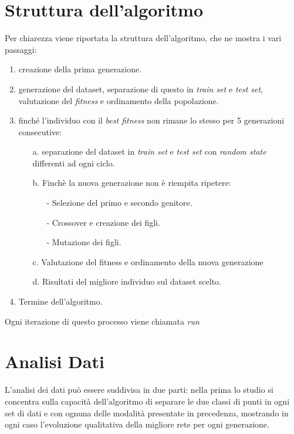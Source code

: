 \documentclass[12pt,a4paper]{report}
\begin{document}
\section{Struttura dell'algoritmo }

Per chiarezza viene riportata la struttura dell'algoritmo, che ne mostra i vari passaggi:

\begin{enumerate}
 \item creazione della prima generazione.
 \item generazione del dataset, separazione di questo in \textit{train set} e \textit{test set}, valutazione del \textit{fitness} e ordinamento della popolazione.
 \item finché l'individuo con il \textit{best fitness} non rimane lo stesso per 5 generazioni consecutive:
 \begin{enumerate}
  \item[a.] separazione del dataset in \textit{train set} e \textit{test set} con \textit{random state} differenti ad ogni ciclo.
  \item[b.] Finchè la nuova generazione non è riempita ripetere:
  \begin{enumerate}
   \item [-] Selezione del primo e secondo genitore.
   \item [-] Crossover e creazione dei figli.
   \item [-] Mutazione dei figli.
  \end{enumerate}
  \item [c.] Valutazione del fitness e ordinamento della nuova generazione
  \item [d.] Risultati del migliore individuo sul dataset scelto.
 \end{enumerate}
 \item Termine dell'algoritmo.
\end{enumerate}

Ogni iterazione di questo processo viene chiamata \textit{run}

\section{Analisi Dati}

L'analisi dei dati può essere suddivisa in due parti: nella prima lo studio si concentra sulla capacità dell'algoritmo di separare le due classi di punti in ogni set di dati e con ognuna delle modalità presentate in precedenza, mostrando in ogni caso l'evoluzione qualitativa della migliore rete per ogni generazione.
\end{document}
